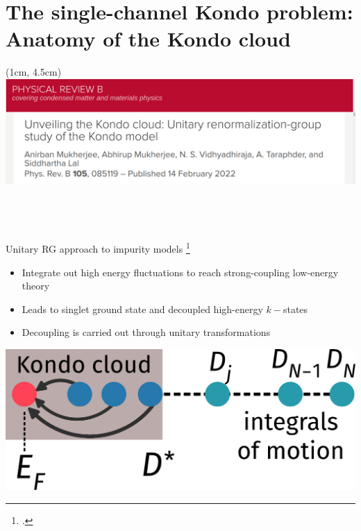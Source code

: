 \documentclass[10pt,aspectratio=169]{beamer}
\begin{document}
\section{The single-channel Kondo problem:\\ Anatomy of the Kondo cloud}
\begin{textblock*}{\textwidth}(1cm, 4.5cm)
\includegraphics[width=\textwidth]{kondocloud_prb.pdf}\\
\end{textblock*}
\subsection{~}

\begin{frame}{Unitary RG approach to impurity models}
\footcite{anirbanurg1,anirbanurg2}
\begin{minipage}{0.5\textwidth}
\begin{itemize}
	\item Integrate out \alert{high energy fluctuations} to reach strong-coupling low-energy theory\\[10pt]
	\item Leads to \alert{singlet ground state} and decoupled high-energy \(k-\)states\\[10pt]
	\item Decoupling is carried out through \alert{unitary transformations}
\end{itemize}

\end{minipage}
\hspace*{\fill}
\begin{minipage}{0.4\textwidth}
\includegraphics[width=\textwidth]{kondo_fp_1D.pdf}
\end{minipage}
	
\end{frame}
\end{document}
